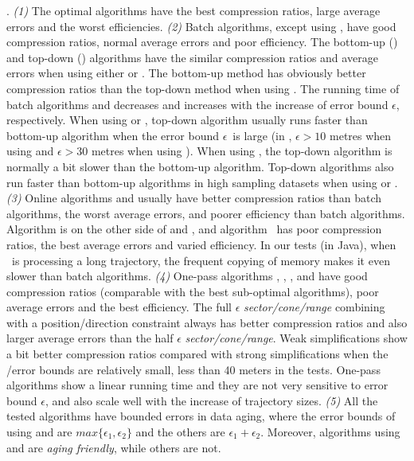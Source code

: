 {.
\emph{(1)} The optimal algorithms have the best compression ratios, large average errors and the worst efficiencies.
%
\emph{(2)} Batch algorithms, except \dpa using \dad, have good compression ratios, normal average errors and poor efficiency.
%
The bottom-up (\tpa) and top-down (\dpa) algorithms have the similar compression ratios and average errors when using either \ped or \sed. The bottom-up method has obviously better compression ratios than the top-down method when using \dad.
%
The running time of batch algorithms \dpa and \tpa decreases and increases with the increase of error bound $\epsilon$, respectively. When using \ped or \sed, top-down algorithm \dpa usually runs faster than bottom-up algorithm \tpa when the error bound $\epsilon$~is large  (\eg in \geolife, $\epsilon >10$ metres when using \ped and $\epsilon >30$ metres when using \sed). When using \dad, the top-down algorithm is normally a bit slower than the bottom-up algorithm.
Top-down algorithms also run faster than bottom-up algorithms in high sampling datasets when using \ped or \sed.
%
\emph{(3)} Online algorithms \opwa and \bqsa usually have better compression ratios than batch algorithms, the worst average errors, and poorer efficiency than batch algorithms. Algorithm \squishe is on the other side of \opwa and \bqsa,
{and algorithm \dagots~has poor compression ratios, the best average errors and varied efficiency. In our tests (in Java), when \dagots~is processing a long trajectory, the frequent copying of memory makes it even slower than batch algorithms.}
%
\emph{(4)} One-pass algorithms \operb, \siped, \cised, \intersec and \interval have good compression ratios (comparable with the best sub-optimal algorithms), poor average errors and the best efficiency.
%
The full $\epsilon$ \emph{sector/cone/range} combining with a position/direction constraint always has better compression ratios and also larger average errors than the half $\epsilon$ \emph{sector/cone/range}. %
%
{Weak simplifications show a bit better compression ratios compared with strong simplifications when the \sed/\ped error bounds are relatively small, \eg less than 40 meters in the tests.}
One-pass algorithms show a linear running time and they are not very sensitive to error bound $\epsilon$, and also scale well with the increase of trajectory sizes.
%
\emph{(5)} {All the tested algorithms have bounded errors in data aging, where the error bounds of \dpa using \ped and \sed are $max\{\epsilon_1, \epsilon_2\}$ and the others are $\epsilon_1 + \epsilon_2$. Moreover, algorithms \dpa using \ped and \sed are \emph{aging friendly}, while others are not. }

}
